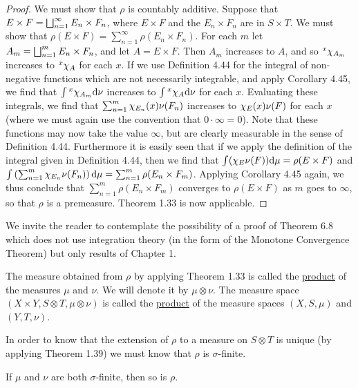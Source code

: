 \begin{proof}
We must show that $\rho$ is countably additive. Suppose that $E\times F=\bigdu_{n=1}^\infty E_n\times F_n$, where $E\times F$ and the $E_n\times F_n$ are in $S\times T$. We must show that $\rho(E\times F)=\sum_{n=1}^\infty\rho(E_n\times F_n)$. For each $m$ let $A_m=\bigdu_{n=1}^mE_n\times F_n$, and let $A=E\times F$. Then $A_m$ increases to $A$, and so $\xsec{\idf{A_m}}{x}$ increases to $\xsec{\idf{A}}{x}$ for each $x$. If we use Definition 4.44 for the integral of non-negative functions which are not necessarily integrable, and apply Corollary 4.45, we find that $\int\xsec{\idf{A_m}}{x}\dd\nu$ increases to $\int\xsec{\idf{A}}{x}\dd\nu$ for each $x$. Evaluating these integrals, we find that $\sum_{n=1}^m\idf{E_n}(x)\nu(F_n)$ increases to $\idf{E}(x)\nu(F)$ for each $x$ (where we must again use the convention that $0\cdot\infty=0$). Note that these functions may now take the value $\infty$, but are clearly measurable in the sense of Definition 4.44. Furthermore it is easily seen that if we apply the definition of the integral given in Definition 4.44, then we find that $\int(\idf{E}\nu(F))\dd\mu=\rho(E\times F)$ and $\int\br{\sum_{n=1}^m\idf{E_n}\nu(F_n)}\dd\mu=\sum_{n=1}^m\rho(E_n\times F_m)$. Applying Corollary 4.45 again, we thus conclude that $\sum_{n=1}^m\rho(E_n\times F_m)$ converges to $\rho(E\times F)$ as $m$ goes to $\infty$, so that $\rho$ is a premeasure. Theorem 1.33 is now applicable.
\end{proof}

We invite the reader to contemplate the possibility of a proof of Theorem 6.8 which does not use integration theory (in the form of the Monotone Convergence Theorem) but only results of Chapter 1.

\begin{definition}
The measure obtained from $\rho$ by applying Theorem 1.33 is called the \underline{product} of the measures $\mu$ and $\nu$. We will denote it by $\mu\otimes\nu$. The measure space $(X\times Y, S\otimes T,\mu\otimes\nu)$ is called the \underline{product} of the measure spaces $(X,S,\mu)$ and $(Y,T,\nu)$.
\end{definition}

In order to know that the extension of $\rho$ to a measure on $S\otimes T$ is unique (by applying Theorem 1.39) we must know that $\rho$ is $\sigma$-finite.

\begin{proposition}
If $\mu$ and $\nu$ are both $\sigma$-finite, then so is $\rho$.
\end{proposition}

